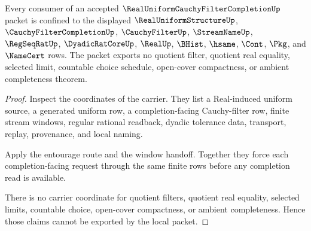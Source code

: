 \begin{theorem}
\label{thm:real-uniform-cauchy-filter-completion-nonescape}
Every consumer of an accepted $\RealUniformCauchyFilterCompletionUp$ packet is confined to the displayed $\RealUniformStructureUp$, $\CauchyFilterCompletionUp$, $\CauchyFilterUp$, $\StreamNameUp$, $\RegSeqRatUp$, $\DyadicRatCoreUp$, $\RealUp$, $\BHist$, $\hsame$, $\Cont$, $\Pkg$, and $\NameCert$ rows. The packet exports no quotient filter, quotient real equality, selected limit, countable choice schedule, open-cover compactness, or ambient completeness theorem.
\end{theorem}
\begin{proof}
Inspect the coordinates of the carrier. They list a Real-induced uniform source, a generated uniform row, a completion-facing Cauchy-filter row, finite stream windows, regular rational readback, dyadic tolerance data, transport, replay, provenance, and local naming.

Apply the entourage route and the window handoff. Together they force each completion-facing request through the same finite rows before any completion read is available.

There is no carrier coordinate for quotient filters, quotient real equality, selected limits, countable choice, open-cover compactness, or ambient completeness. Hence those claims cannot be exported by the local packet.
\end{proof}


\begin{closurestatus}{\RealUniformCauchyFilterCompletionUp}
  \theoryclosure{\seedClosure}
  \formalstatus{\formalTargetV}
\end{closurestatus}
